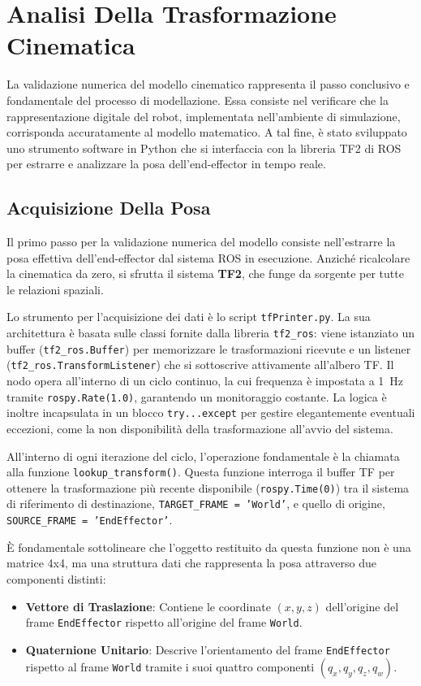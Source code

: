 \documentclass[11pt, a4paper]{report}
\begin{document}
\chapter{Analisi Della Trasformazione Cinematica}
\label{chap:analisi_cinematica}
La validazione numerica del modello cinematico rappresenta il passo conclusivo e fondamentale del processo di modellazione. Essa consiste nel verificare che la rappresentazione digitale del robot, implementata nell'ambiente di simulazione, corrisponda accuratamente al modello matematico. A tal fine, è stato sviluppato uno strumento software in Python che si interfaccia con la libreria TF2 di ROS per estrarre e analizzare la posa dell'end-effector in tempo reale.

\section{Acquisizione Della Posa}
\label{sec:acquisizione_dati}
Il primo passo per la validazione numerica del modello consiste nell'estrarre la posa effettiva dell'end-effector dal sistema ROS in esecuzione. Anziché ricalcolare la cinematica da zero, si sfrutta il sistema \textbf{TF2}, che funge da sorgente per tutte le relazioni spaziali.

Lo strumento per l'acquisizione dei dati è lo script \texttt{tfPrinter.py}. La sua architettura è basata sulle classi fornite dalla libreria \texttt{tf2\_ros}: viene istanziato un buffer (\texttt{tf2\_ros.Buffer}) per memorizzare le trasformazioni ricevute e un listener (\texttt{tf2\_ros.TransformListener}) che si sottoscrive attivamente all'albero TF. Il nodo opera all'interno di un ciclo continuo, la cui frequenza è impostata a 1~Hz tramite \texttt{rospy.Rate(1.0)}, garantendo un monitoraggio costante. La logica è inoltre incapsulata in un blocco \texttt{try...except} per gestire elegantemente eventuali eccezioni, come la non disponibilità della trasformazione all'avvio del sistema.

All'interno di ogni iterazione del ciclo, l'operazione fondamentale è la chiamata alla funzione \texttt{lookup\_transform()}. Questa funzione interroga il buffer TF per ottenere la trasformazione più recente disponibile (\texttt{rospy.Time(0)}) tra il sistema di riferimento di destinazione, \texttt{TARGET\_FRAME = 'World'}, e quello di origine, \texttt{SOURCE\_FRAME = 'EndEffector'}.

È fondamentale sottolineare che l'oggetto restituito da questa funzione non è una matrice 4x4, ma una struttura dati che rappresenta la posa attraverso due componenti distinti:
\begin{itemize}
    \item \textbf{Vettore di Traslazione}: Contiene le coordinate \((x, y, z)\) dell'origine del frame \texttt{EndEffector} rispetto all'origine del frame \texttt{World}.
    \item \textbf{Quaternione Unitario}: Descrive l'orientamento del frame \texttt{EndEffector} rispetto al frame \texttt{World} tramite i suoi quattro componenti \((q_x, q_y, q_z, q_w)\).
\end{itemize}
\end{document}
